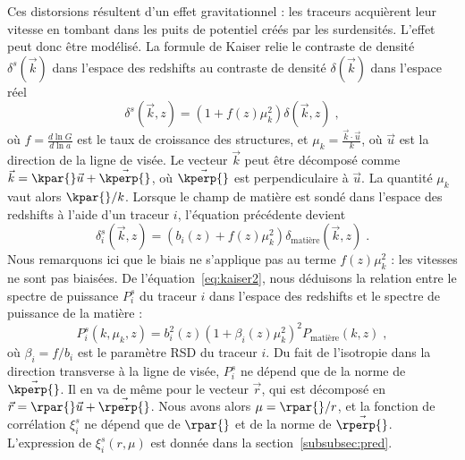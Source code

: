 Ces distorsions résultent d'un effet gravitationnel : les traceurs acquièrent leur vitesse en tombant dans les puits de potentiel créés par les surdensités. L'effet peut donc être modélisé.
La formule de Kaiser \autocite{Kaiser1987} relie le contraste de densité $\delta^s(\vec k)$ dans l'espace des redshifts au contraste de densité $\delta(\vec k)$ dans l'espace réel
\begin{equation}
  \label{eq:kaiser}
  \delta^{s}(\vec k, z) = (1 + f(z) \mu_k^2) \delta(\vec k, z)  \; ,
\end{equation}
où $f = \displaystyle \frac{d \ln{G}}{d \ln{a}}$ est le taux de croissance des structures, et $\mu_k = \displaystyle \frac{\vec k \cdot \vec u}{k}$, où $\vec u$ est la direction de la ligne de visée.
Le vecteur $\vec k$ peut être décomposé comme $\vec k = \kpar{} \vec u + \vec \kperp{}$, où $\vec \kperp{}$ est perpendiculaire à $\vec u$. La quantité $\mu_k$ vaut alors $\kpar{} / k$. 
Lorsque le champ de matière est sondé dans l'espace des redshifts à l'aide d'un traceur $i$, l'équation précédente devient
\begin{equation}
  \label{eq:kaiser2}
  \delta_i^{s}(\vec k, z) = (b_i(z) + f(z) \mu_k^2) \delta_{\mathrm{matière}}(\vec k, z)  \; .
\end{equation}
Nous remarquons ici que le biais ne s'applique pas au terme $f(z) \mu_k^2$ : les vitesses ne sont pas biaisées.
De l'équation~\ref{eq:kaiser2}, nous déduisons la relation entre le spectre de puissance $P_{i}^{s}$ du traceur $i$ dans l'espace des redshifts et le spectre de puissance de la matière :
\begin{equation}
  \label{eq:kaiser3}
  P_{i}^s(k, \mu_k, z) = b_{i}^2(z)(1 + \beta_i(z) \mu_k^2)^2 P_{\mathrm{matière}}(k, z)  \; ,
\end{equation}
où $\beta_i = f / b_i$ est le paramètre RSD du traceur $i$.
Du fait de l'isotropie dans la direction transverse à la ligne de visée, $P_i^s$ ne dépend que de la norme de $\vec \kperp{}$. Il en va de même pour le vecteur $\vec r$, qui est décomposé en $\vec r =  \rpar{} \vec u + \vec \rperp{}$. Nous avons alors $\mu = \rpar{} / r$, et la fonction de corrélation $\xi_i^s$ ne dépend que de $\rpar{}$ et de la norme de $\vec \rperp{}$. L'expression de $\xi_i^s(r, \mu)$ est donnée dans la section~\ref{subsubsec:pred}.

